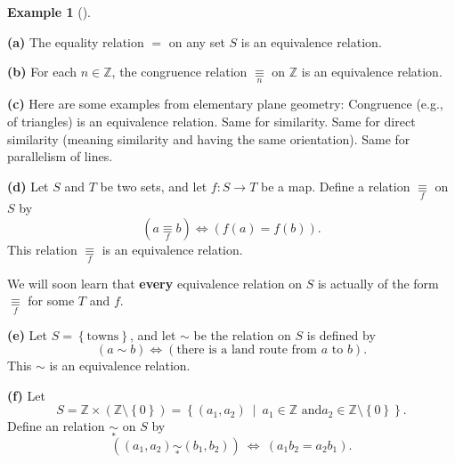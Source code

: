 \documentclass[numbers=enddot,12pt,final,onecolumn,notitlepage]{scrartcl}%
\numberwithin{exer}{subsection}
\theoremstyle{definition}
\newtheorem{exam}[theo]{Example}
\newenvironment{example}[1][]
{\begin{exam}[#1]\begin{leftbar}}
{\end{leftbar}\end{exam}}
\begin{document}
\begin{example}
\textbf{(a)} The equality relation $=$ on any set $S$ is an equivalence relation.

\textbf{(b)} For each $n\in\mathbb{Z}$, the congruence relation
$\underset{n}{\equiv}$ on $\mathbb{Z}$ is an equivalence relation.

\textbf{(c)} Here are some examples from elementary plane geometry: Congruence
(e.g., of triangles) is an equivalence relation. Same for similarity. Same for
direct similarity (meaning similarity and having the same orientation). Same
for parallelism of lines.

\textbf{(d)} Let $S$ and $T$ be two sets, and let $f:S\rightarrow T$ be a map.
Define a relation $\underset{f}{\equiv}$ on $S$ by%
\[
\left(  a\underset{f}{\equiv}b\right)  \Longleftrightarrow\left(  f\left(
a\right)  =f\left(  b\right)  \right)  .
\]
This relation $\underset{f}{\equiv}$ is an equivalence relation.

We will soon learn that \textbf{every} equivalence relation on $S$ is actually
of the form $\underset{f}{\equiv}$ for some $T$ and $f$.

\textbf{(e)} Let $S=\left\{  \text{towns}\right\}  $, and let $\sim$ be the
relation on $S$ is defined by%
\[
\left(  a\sim b\right)  \Longleftrightarrow\left(  \text{there is a land route
from }a\text{ to }b\right)  .
\]
This $\sim$ is an equivalence relation.

\textbf{(f)} Let
\[
S=\mathbb{Z}\times\left(  \mathbb{Z}\setminus\left\{  0\right\}  \right)
=\left\{  \left(  a_{1},a_{2}\right)  \ \mid\ a_{1}\in\mathbb{Z}\text{ and
}a_{2}\in\mathbb{Z}\setminus\left\{  0\right\}  \right\}  .
\]
Define an relation $\underset{\ast}{\sim}$ on $S$ by%
\[
\left(  \left(  a_{1},a_{2}\right)  \underset{\ast}{\sim}\left(  b_{1}%
,b_{2}\right)  \right)  \ \Longleftrightarrow\ \left(  a_{1}b_{2}=a_{2}%
b_{1}\right)  .
\]



\end{example}
\end{document}
